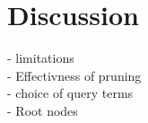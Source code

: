 
\chapter{Discussion}

- limitations\\
- Effectivness of pruning\\
- choice of query terms\\
- Root nodes\\



\clearpage